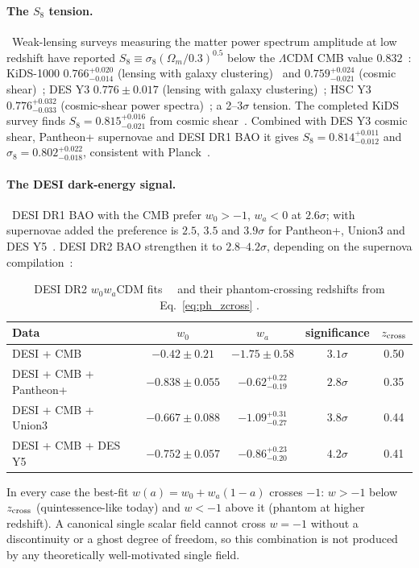 \paragraph{The $S_8$ tension.} \observed\ Weak-lensing surveys measuring the matter power spectrum amplitude at low redshift have reported
$S_8\equiv\sigma_8(\Omega_m/0.3)^{0.5}$ below the $\Lambda$CDM CMB value $0.832$~\cite{Planck2018VI}: KiDS-1000 $0.766^{+0.020}_{-0.014}$ (lensing with
galaxy clustering)~\cite{Heymans2021} and $0.759^{+0.024}_{-0.021}$ (cosmic shear)~\cite{Asgari2021}; DES Y3 $0.776\pm0.017$ (lensing with galaxy
clustering)~\cite{DESY3}; HSC Y3 $0.776^{+0.032}_{-0.033}$ (cosmic-shear power spectra)~\cite{HSCY3Dalal}; a 2--3$\sigma$ tension. The completed KiDS
survey finds $S_8=0.815^{+0.016}_{-0.021}$ from cosmic shear~\cite{Wright2025}. Combined with DES Y3 cosmic shear, Pantheon+ supernovae and DESI DR1 BAO it
gives $S_8=0.814^{+0.011}_{-0.012}$ and $\sigma_8=0.802^{+0.022}_{-0.018}$, consistent with Planck~\cite{Stolzner2025}.

\paragraph{The DESI dark-energy signal.} \observed\ DESI DR1 BAO with the CMB prefer $w_0>-1$, $w_a<0$ at $2.6\sigma$; with supernovae added the
preference is $2.5$, $3.5$ and $3.9\sigma$ for Pantheon+, Union3 and DES Y5~\cite{DESI2024VI}. DESI DR2 BAO strengthen it to $2.8$--$4.2\sigma$,
depending on the supernova compilation~\cite{DESI2025}:
\begin{table}[htbp]\centering\small
\caption{DESI DR2 $w_0w_a$CDM fits~\cite{DESI2025} \observed\ and their phantom-crossing redshifts from Eq.~\eqref{eq:ph_zcross} \calc.}\label{tab:st_dr2}
\begin{tabular}{lcccc}\toprule
Data & $w_0$ & $w_a$ & significance & $z_{\rm cross}$\\\midrule
DESI + CMB & $-0.42\pm0.21$ & $-1.75\pm0.58$ & $3.1\sigma$ & 0.50\\
DESI + CMB + Pantheon+~\cite{Brout2022} & $-0.838\pm0.055$ & $-0.62^{+0.22}_{-0.19}$ & $2.8\sigma$ & 0.35\\
DESI + CMB + Union3~\cite{Rubin2025} & $-0.667\pm0.088$ & $-1.09^{+0.31}_{-0.27}$ & $3.8\sigma$ & 0.44\\
DESI + CMB + DES Y5~\cite{DESY5SN2024} & $-0.752\pm0.057$ & $-0.86^{+0.23}_{-0.20}$ & $4.2\sigma$ & 0.41\\\bottomrule
\end{tabular}\end{table}
In every case the best-fit $w(a)=w_0+w_a(1-a)$ crosses $-1$: $w>-1$ below $z_{\rm cross}$ (quintessence-like today) and $w<-1$ above it (phantom at
higher redshift). A canonical single scalar field cannot cross $w=-1$ without a discontinuity or a ghost degree of freedom, so this combination is not
produced by any theoretically well-motivated single field. \interp

